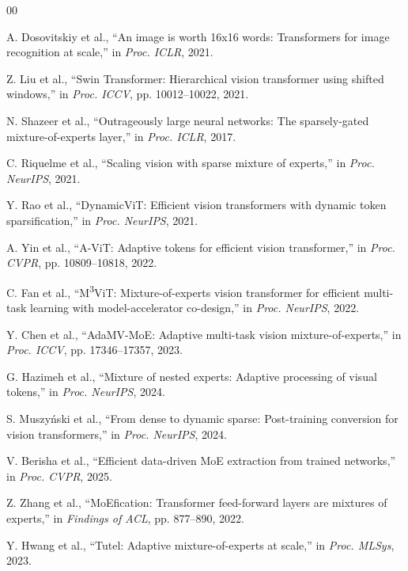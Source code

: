 \documentclass[conference]{IEEEtran}
\begin{document}
\begin{thebibliography}{00}

A. Dosovitskiy et al., ``An image is worth 16x16 words: Transformers for image recognition at scale,'' in \textit{Proc. ICLR}, 2021.

Z. Liu et al., ``Swin Transformer: Hierarchical vision transformer using shifted windows,'' in \textit{Proc. ICCV}, pp. 10012--10022, 2021.

N. Shazeer et al., ``Outrageously large neural networks: The sparsely-gated mixture-of-experts layer,'' in \textit{Proc. ICLR}, 2017.

C. Riquelme et al., ``Scaling vision with sparse mixture of experts,'' in \textit{Proc. NeurIPS}, 2021.

Y. Rao et al., ``DynamicViT: Efficient vision transformers with dynamic token sparsification,'' in \textit{Proc. NeurIPS}, 2021.

A. Yin et al., ``A-ViT: Adaptive tokens for efficient vision transformer,'' in \textit{Proc. CVPR}, pp. 10809--10818, 2022.

C. Fan et al., ``M\textsuperscript{3}ViT: Mixture-of-experts vision transformer for efficient multi-task learning with model-accelerator co-design,'' in \textit{Proc. NeurIPS}, 2022.

Y. Chen et al., ``AdaMV-MoE: Adaptive multi-task vision mixture-of-experts,'' in \textit{Proc. ICCV}, pp. 17346--17357, 2023.

G. Hazimeh et al., ``Mixture of nested experts: Adaptive processing of visual tokens,'' in \textit{Proc. NeurIPS}, 2024.

S. Muszyński et al., ``From dense to dynamic sparse: Post-training conversion for vision transformers,'' in \textit{Proc. NeurIPS}, 2024.

V. Berisha et al., ``Efficient data-driven MoE extraction from trained networks,'' in \textit{Proc. CVPR}, 2025.

Z. Zhang et al., ``MoEfication: Transformer feed-forward layers are mixtures of experts,'' in \textit{Findings of ACL}, pp. 877--890, 2022.

Y. Hwang et al., ``Tutel: Adaptive mixture-of-experts at scale,'' in \textit{Proc. MLSys}, 2023.


\end{thebibliography}
\end{document}
